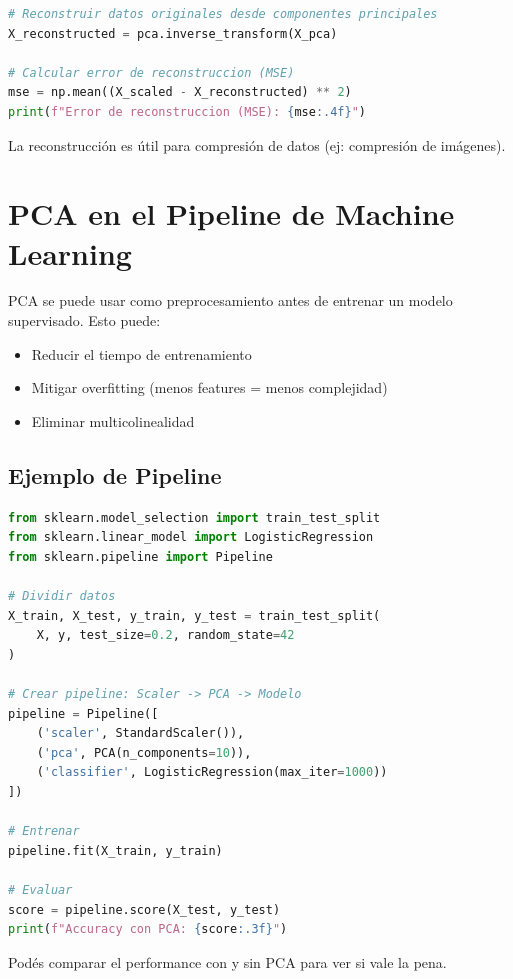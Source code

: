 \documentclass[12pt]{article}
\begin{document}
\begin{lstlisting}[language=Python]
# Reconstruir datos originales desde componentes principales
X_reconstructed = pca.inverse_transform(X_pca)

# Calcular error de reconstruccion (MSE)
mse = np.mean((X_scaled - X_reconstructed) ** 2)
print(f"Error de reconstruccion (MSE): {mse:.4f}")
\end{lstlisting}

La reconstrucción es útil para compresión de datos (ej: compresión de imágenes).

\section{PCA en el Pipeline de Machine Learning}

PCA se puede usar como preprocesamiento antes de entrenar un modelo supervisado. Esto puede:

\begin{itemize}
    \item Reducir el tiempo de entrenamiento
    \item Mitigar overfitting (menos features = menos complejidad)
    \item Eliminar multicolinealidad
\end{itemize}

\subsection{Ejemplo de Pipeline}

\begin{lstlisting}[language=Python]
from sklearn.model_selection import train_test_split
from sklearn.linear_model import LogisticRegression
from sklearn.pipeline import Pipeline

# Dividir datos
X_train, X_test, y_train, y_test = train_test_split(
    X, y, test_size=0.2, random_state=42
)

# Crear pipeline: Scaler -> PCA -> Modelo
pipeline = Pipeline([
    ('scaler', StandardScaler()),
    ('pca', PCA(n_components=10)),
    ('classifier', LogisticRegression(max_iter=1000))
])

# Entrenar
pipeline.fit(X_train, y_train)

# Evaluar
score = pipeline.score(X_test, y_test)
print(f"Accuracy con PCA: {score:.3f}")
\end{lstlisting}

Podés comparar el performance con y sin PCA para ver si vale la pena.
\end{document}
